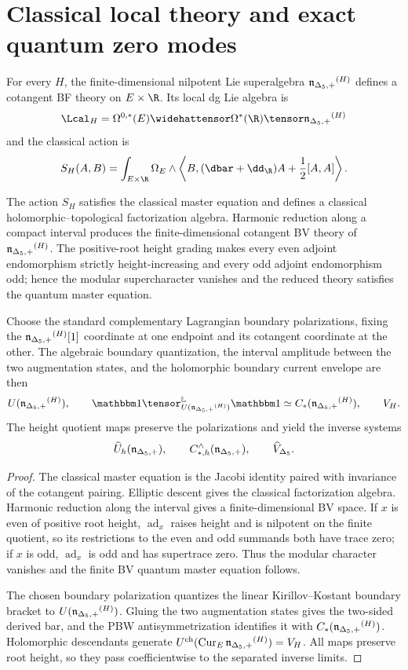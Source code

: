 \section{Classical local theory and exact quantum zero modes}
For every $H$, the finite-dimensional nilpotent Lie superalgebra ${\mathfrak n_{\Delta_5,+}}^{(H)}$ defines a cotangent BF theory on $E\times\R$.  Its local dg Lie algebra is
\[
 \Lcal_H=\Omega^{0,*}(E)\widehattensor\Omega^*(\R)\tensor\nIg^{(H)}
\]
and the classical action is
\[
 S_H(A,B)=\int_{E\times\R}\Omega_E\wedge
 \left\langle B,(\dbar+\dd_{\R})A+\frac12[A,A]\right\rangle .
\]

\begin{theorem}
The action $S_H$ satisfies the classical master equation and defines a classical holomorphic--topological factorization algebra.  Harmonic reduction along a compact interval produces the finite-dimensional cotangent BV theory of ${\mathfrak n_{\Delta_5,+}}^{(H)}$.  The positive-root height grading makes every even adjoint endomorphism strictly height-increasing and every odd adjoint endomorphism odd; hence the modular supercharacter vanishes and the reduced theory satisfies the quantum master equation.

Choose the standard complementary Lagrangian boundary polarizations, fixing the ${\mathfrak n_{\Delta_5,+}}^{(H)}[1]$ coordinate at one endpoint and its cotangent coordinate at the other.  The algebraic boundary quantization, the interval amplitude between the two augmentation states, and the holomorphic boundary current envelope are then
\[
 U(\nIg^{(H)}),\qquad
 \mathbbm1\tensor^{\mathbb L}_{U(\nIg^{(H)})}\mathbbm1
 \simeq C_*(\nIg^{(H)}),\qquad V_H.
\]
The height quotient maps preserve the polarizations and yield the inverse systems
\[
 \widehat U_h({\mathfrak n_{\Delta_5,+}}),\qquad
 C_{*,h}^{\wedge}({\mathfrak n_{\Delta_5,+}}),\qquad
 \widehat V_{\Delta_5}.
\]
\end{theorem}
\begin{proof}
The classical master equation is the Jacobi identity paired with invariance of the cotangent pairing.  Elliptic descent gives the classical factorization algebra.  Harmonic reduction along the interval gives a finite-dimensional BV space.  If $x$ is even of positive root height, $\operatorname{ad}_x$ raises height and is nilpotent on the finite quotient, so its restrictions to the even and odd summands both have trace zero; if $x$ is odd, $\operatorname{ad}_x$ is odd and has supertrace zero.  Thus the modular character vanishes and the finite BV quantum master equation follows.

The chosen boundary polarization quantizes the linear Kirillov--Kostant boundary bracket to $U({\mathfrak n_{\Delta_5,+}}^{(H)})$.  Gluing the two augmentation states gives the two-sided derived bar, and the PBW antisymmetrization identifies it with $C_*({\mathfrak n_{\Delta_5,+}}^{(H)})$.  Holomorphic descendants generate $U^{\mathrm{ch}}(\operatorname{Cur}_E{\mathfrak n_{\Delta_5,+}}^{(H)})=V_H$.  All maps preserve root height, so they pass coefficientwise to the separated inverse limits.
\end{proof}

